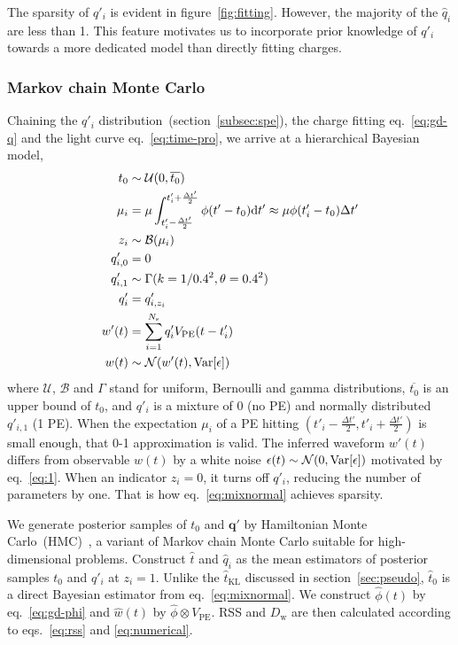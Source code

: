 The sparsity of $q'_i$ is evident in figure~\ref{fig:fitting}.  However, the majority of the $\hat{q}_i$ are less than 1.  This feature motivates us to incorporate prior knowledge of $q'_i$ towards a more dedicated model than directly fitting charges.


\subsubsection{Markov chain Monte Carlo}
\label{subsec:mcmc}
Chaining the $q'_i$ distribution~(section~\ref{subsec:spe}), the charge fitting eq.~\eqref{eq:gd-q} and the light curve eq.~\eqref{eq:time-pro}, we arrive at a hierarchical Bayesian model,
\begin{equation}
  \begin{aligned}
    t_{0} &\sim \mathcal{U}(0, \overline{t_0}) \\
    \mu_i &= \mu \int_{t'_i-\frac{\Delta t'}{2}}^{t'_i+\frac{\Delta t'}{2}} \phi(t' - t_0)\mathrm{d}t' \approx \mu\phi(t'_i - t_0)\Delta{t'} \\
    z_i &\sim \mathcal{B}(\mu_i) \\
    q'_{i,0}&=0\\
    q'_{i,1}& \sim \Gamma(k=1/0.4^2, \theta=0.4^2)\\
    q'_i &= q'_{i,z_i}\\
    w'(t) & = \sum_{i=1}^{N_\mathrm{s}}q'_iV_\mathrm{PE}(t-t'_i)\\
    w(t) &\sim \mathcal{N}(w'(t), \operatorname{Var}[\epsilon])
  \end{aligned}
  \label{eq:mixnormal}
\end{equation}
where $\mathcal{U}$, $\mathcal{B}$ and $\Gamma$ stand for uniform, Bernoulli and gamma distributions, $\overline{t_0}$ is an upper bound of $t_0$, and $q'_i$ is a mixture of 0 (no PE) and normally distributed $q'_{i,1}$ (1 PE). When the expectation $\mu_i$ of a PE hitting $(t'_{i} - \frac{\Delta t'}{2}, t'_{i} + \frac{\Delta t'}{2})$ is small enough, that 0-1 approximation is valid.  The inferred waveform $w'(t)$ differs from observable $w(t)$ by a white noise $\epsilon(t) \sim \mathcal{N}(0, \operatorname{Var}[\epsilon])$ motivated by eq.~\eqref{eq:1}.  When an indicator $z_i=0$, it turns off $q'_i$, reducing the number of parameters by one.  That is how eq.~\eqref{eq:mixnormal} achieves sparsity.

We generate posterior samples of $t_0$ and $\bm{q'}$ by Hamiltonian Monte Carlo~(HMC)~\cite{neal_mcmc_2012}, a variant of Markov chain Monte Carlo suitable for high-dimensional problems. Construct $\hat{t}$ and $\hat{q}_i$ as the mean estimators of posterior samples $t_0$ and $q'_i$ at $z_i=1$.  Unlike the $\hat{t}_\mathrm{KL}$ discussed in section~\ref{sec:pseudo}, $\hat{t}_0$ is a direct Bayesian estimator from eq.~\eqref{eq:mixnormal}.  We construct $\hat{\phi}(t)$ by eq.~\eqref{eq:gd-phi} and $\hat{w}(t)$ by $\hat{\phi} \otimes V_\mathrm{PE}$. RSS and $D_\mathrm{w}$ are then calculated according to eqs.~\eqref{eq:rss} and \eqref{eq:numerical}.

